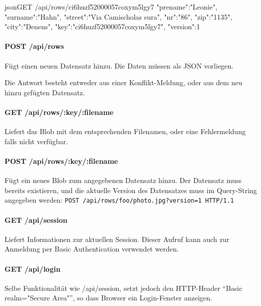 \begin{srclst}{json}{GET /api/rows/ci6huzf52000057coxym5lgy7}
{
    "prename":"Leonie", "surname":"Hahn", 
    "street":"Via Camischolas sura", "nr":"86", 
    "zip":"1135", "city":"Denens", 
    "key":"ci6huzf52000057coxym5lgy7", "version":1
}
\end{srclst}

\paragraph{POST /api/rows}
Fügt einen neuen Datensatz hinzu. Die Daten müssen als JSON vorliegen.

Die Antwort besteht entweder aus einer Konflikt-Meldung, oder aus dem neu hinzu gefügten Datensatz.


\paragraph{GET /api/rows/:key/:filename}
Liefert das Blob mit dem entsprechenden Filenamen, oder eine Fehlermeldung falls nicht verfügbar.

\paragraph{POST /api/rows/:key/:filename}
Fügt ein neues Blob zum angegebenen Datensatz hinzu. Der Datensatz muss bereits existieren, und die aktuelle Version des Datensatzes muss im Query-String angegeben werden: \texttt{POST /api/rows/foo/photo.jpg?version=1 HTTP/1.1}

\paragraph{GET /api/session}
Liefert Informationen zur aktuellen Session. Dieser Aufruf kann auch zur Anmeldung per Basic Authentication verwendet werden.

\paragraph{GET /api/login}
Selbe Funktionalität wie /api/session, setzt jedoch den HTTP-Header ``Basic realm="Secure Area"'', so dass Browser ein Login-Fenster anzeigen.

